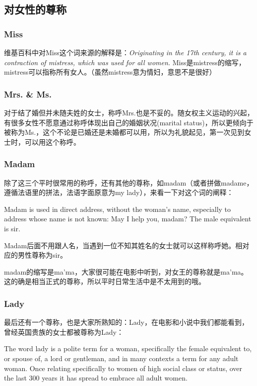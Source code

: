 \subsection{对女性的尊称}
\subsubsection{Miss}
维基百科中对Miss这个词来源的解释是：\textit{Originating in the 17th century, it is a contraction of mistress, which was used for all women.} Miss是mistress的缩写，mistress可以指称所有女人。（虽然mistress意为情妇，意思不是很好）

\subsubsection{Mrs. \& Ms.}
对于结了婚但并未随夫姓的女士，称呼Mrs.也是不妥的。随女权主义运动的兴起，有很多女性不愿意通过称呼体现出自己的婚姻状况(marital status)，所以更倾向于被称为Ms.，这个不论是已婚还是未婚都可以用，所以为礼貌起见，第一次见到女士时，可以用这个称呼。

\subsubsection{Madam}
除了这三个平时很常用的称呼，还有其他的尊称，如madam（或者拼做madame，遵循法语里的拼法，法语字面原意为my lady），来看一下对这个词的阐释：

Madam is used in direct address, without the woman's name, especially to address whose name is not known: May I help you, madam? The male equivalent is sir.

Madam后面不用跟人名，当遇到一位不知其姓名的女士就可以这样称呼她。相对应的男性尊称为sir。

madam的缩写是ma'ma，大家很可能在电影中听到，对女王的尊称就是ma'ma。这的确是相当正式的尊称，所以平时日常生活中是不太用到的哦。

\subsubsection{Lady}
最后还有一个尊称，也是大家所熟知的：Lady，在电影和小说中我们都能看到，曾经英国贵族的女士都被尊称为Lady：

The word lady is a polite term for a woman, specifically the female equivalent to, or spouse of, a lord or gentleman, and in many contexts a term for any adult woman. Once relating specifically to women of high social class or status, over the last 300 years it has spread to embrace all adult women.

